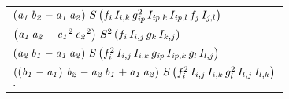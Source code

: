 \documentclass[12pt]{article}
\begin{document}
 \begin{longtable}{l}
$\left({\it a_1}\,{\it b_2}-{\it a_1}\,{\it a_2}\right)\,S\left(f_{i
 }\,I_{i,k}\,g_{{\it ip}}^2\,I_{{\it ip},k}\,I_{{\it ip},l}\,f_{j}\,I
 _{j,l}\right)$
\\
$\left({\it a_1}\,{\it a_2}-{\it e_1}^2\,{\it e_2}^2\right)\,S^2
 \left(f_{i}\,I_{i,j}\,g_{k}\,I_{k,j}\right)$
\\
$\left({\it a_2}\,{\it b_1}-{\it a_1}\,{\it a_2}\right)\,S\left(f_{i
 }^2\,I_{i,j}\,I_{i,k}\,g_{{\it ip}}\,I_{{\it ip},k}\,g_{l}\,I_{l,j}
 \right)$
\\
$\left(\left({\it b_1}-{\it a_1}\right)\,{\it b_2}-{\it a_2}\,
 {\it b_1}+{\it a_1}\,{\it a_2}\right)\,S\left(f_{i}^2\,I_{i,j}\,I_{i
 ,k}\,g_{l}^2\,I_{l,j}\,I_{l,k}\right)$
\\
$\cdot$
\end{longtable}
\end{document}
